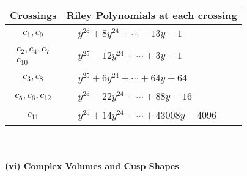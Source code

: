 \documentclass[1p]{elsarticle_modified}
\theoremstyle{definition}
\begin{document}
\begin{tabular}{m{50pt}|m{274pt}}
Crossings & \hspace{64pt}Riley Polynomials at each crossing \\
\hline $$\begin{aligned}c_{1},c_{9}\end{aligned}$$&$\begin{aligned}
&y^{25}+8 y^{24}+\cdots-13 y-1
\end{aligned}$\\
\hline $$\begin{aligned}c_{2},c_{4},c_{7}\\c_{10}\end{aligned}$$&$\begin{aligned}
&y^{25}-12 y^{24}+\cdots+3 y-1
\end{aligned}$\\
\hline $$\begin{aligned}c_{3},c_{8}\end{aligned}$$&$\begin{aligned}
&y^{25}+6 y^{24}+\cdots+64 y-64
\end{aligned}$\\
\hline $$\begin{aligned}c_{5},c_{6},c_{12}\end{aligned}$$&$\begin{aligned}
&y^{25}-22 y^{24}+\cdots+88 y-16
\end{aligned}$\\
\hline $$\begin{aligned}c_{11}\end{aligned}$$&$\begin{aligned}
&y^{25}+14 y^{24}+\cdots+43008 y-4096
\end{aligned}$\\
\hline
\end{tabular}\\~\\
\newpage\flushleft \textbf{(vi) Complex Volumes and Cusp Shapes}
\end{document}
